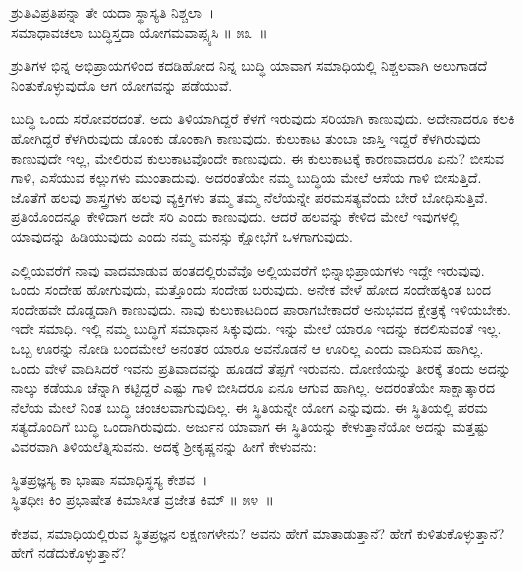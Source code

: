 \begin{shloka}
ಶ್ರುತಿವಿಪ್ರತಿಪನ್ನಾ ತೇ ಯದಾ ಸ್ಥಾಸ್ಯತಿ ನಿಶ್ಚಲಾ~।\\ಸಮಾಧಾವಚಲಾ ಬುದ್ಧಿಸ್ತದಾ ಯೋಗಮವಾಪ್ಸ್ಯಸಿ \hfill॥ ೫೩~॥
\end{shloka}

\begin{artha}
ಶ್ರುತಿಗಳ ಭಿನ್ನ ಅಭಿಪ್ರಾಯಗಳಿಂದ ಕದಡಿಹೋದ ನಿನ್ನ ಬುದ್ಧಿ ಯಾವಾಗ ಸಮಾಧಿಯಲ್ಲಿ ನಿಶ್ಚಲವಾಗಿ ಅಲುಗಾಡದೆ ನಿಂತುಕೊಳ್ಳುವುದೊ ಆಗ ಯೋಗವನ್ನು ಪಡೆಯುವೆ.
\end{artha}

ಬುದ್ಧಿ ಒಂದು ಸರೋವರದಂತೆ. ಅದು ತಿಳಿಯಾಗಿದ್ದರೆ ಕೆಳಗೆ ಇರುವುದು ಸರಿಯಾಗಿ ಕಾಣುವುದು. ಅದೇನಾದರೂ ಕಲಕಿ ಹೋಗಿದ್ದರೆ ಕೆಳಗಿರುವುದು ಡೊಂಕು ಡೊಂಕಾಗಿ ಕಾಣುವುದು. ಕುಲುಕಾಟ ತುಂಬಾ ಜಾಸ್ತಿ ಇದ್ದರೆ ಕೆಳಗಿರುವುದು ಕಾಣುವುದೇ ಇಲ್ಲ, ಮೇಲಿರುವ ಕುಲುಕಾಟವೊಂದೇ ಕಾಣುವುದು. ಈ ಕುಲುಕಾಟಕ್ಕೆ ಕಾರಣವಾದರೂ ಏನು? ಬೀಸುವ ಗಾಳಿ, ಎಸೆಯುವ ಕಲ್ಲುಗಳು ಮುಂತಾದುವು. ಅದರಂತೆಯೇ ನಮ್ಮ ಬುದ್ಧಿಯ ಮೇಲೆ ಆಸೆಯ ಗಾಳಿ ಬೀಸುತ್ತಿದೆ. ಜೊತೆಗೆ ಹಲವು ಶಾಸ್ತ್ರಗಳು ಹಲವು ವ್ಯಕ್ತಿಗಳು ತಮ್ಮ ತಮ್ಮ ನೆಲೆಯನ್ನೇ ಪರಮಸತ್ಯವೆಂದು ಬೇರೆ ಬೋಧಿಸುತ್ತಿವೆ. ಪ್ರತಿಯೊಂದನ್ನೂ ಕೇಳಿದಾಗ ಅದೇ ಸರಿ ಎಂದು ಕಾಣುವುದು. ಆದರೆ ಹಲವನ್ನು ಕೇಳಿದ ಮೇಲೆ ಇವುಗಳಲ್ಲಿ ಯಾವುದನ್ನು ಹಿಡಿಯುವುದು ಎಂದು ನಮ್ಮ ಮನಸ್ಸು ಕ್ಷೋಭೆಗೆ ಒಳಗಾಗುವುದು.

ಎಲ್ಲಿಯವರೆಗೆ ನಾವು ವಾದಮಾಡುವ ಹಂತದಲ್ಲಿರುವೆವೊ ಅಲ್ಲಿಯವರೆಗೆ ಭಿನ್ನಾಭಿಪ್ರಾಯಗಳು ಇದ್ದೇ ಇರುವುವು. ಒಂದು ಸಂದೇಹ ಹೋಗುವುದು, ಮತ್ತೊಂದು ಸಂದೇಹ ಬರುವುದು. ಅನೇಕ ವೇಳೆ ಹೋದ ಸಂದೇಹಕ್ಕಿಂತ ಬಂದ ಸಂದೇಹವೇ ದೊಡ್ಡದಾಗಿ ಕಾಣುವುದು. ನಾವು ಕುಲುಕಾಟದಿಂದ ಪಾರಾಗಬೇಕಾದರೆ ಅನುಭವದ ಕ್ಷೇತ್ರಕ್ಕೆ ಇಳಿಯಬೇಕು. ಇದೇ ಸಮಾಧಿ. ಇಲ್ಲಿ ನಮ್ಮ ಬುದ್ಧಿಗೆ ಸಮಾಧಾನ ಸಿಕ್ಕುವುದು. ಇನ್ನು ಮೇಲೆ ಯಾರೂ ಇದನ್ನು ಕದಲಿಸುವಂತೆ ಇಲ್ಲ. ಒಬ್ಬ ಊರನ್ನು ನೋಡಿ ಬಂದಮೇಲೆ ಅನಂತರ ಯಾರೂ ಅವನೊಡನೆ ಆ ಊರಿಲ್ಲ ಎಂದು ವಾದಿಸುವ ಹಾಗಿಲ್ಲ. ಒಂದು ವೇಳೆ ವಾದಿಸಿದರೆ ಇವನು ಪ್ರತಿವಾದವನ್ನು ಹೂಡದೆ ತೆಪ್ಪಗೆ ಇರುವನು. ದೋಣಿಯನ್ನು ತೀರಕ್ಕೆ ತಂದು ಅದನ್ನು ನಾಲ್ಕು ಕಡೆಯೂ ಚೆನ್ನಾಗಿ ಕಟ್ಟಿದ್ದರೆ ಎಷ್ಟು ಗಾಳಿ ಬೀಸಿದರೂ ಏನೂ ಆಗುವ ಹಾಗಿಲ್ಲ. ಅದರಂತೆಯೇ ಸಾಕ್ಷಾತ್ಕಾರದ ನೆಲೆಯ ಮೇಲೆ ನಿಂತ ಬುದ್ಧಿ ಚಂಚಲವಾಗುವುದಿಲ್ಲ. ಈ ಸ್ಥಿತಿಯನ್ನೇ ಯೋಗ ಎನ್ನುವುದು. ಈ ಸ್ಥಿತಿಯಲ್ಲಿ ಪರಮ ಸತ್ಯದೊಂದಿಗೆ ಬುದ್ಧಿ ಒಂದಾಗಿರುವುದು. ಅರ್ಜುನ ಯಾವಾಗ ಈ ಸ್ಥಿತಿಯನ್ನು ಕೇಳುತ್ತಾನೆಯೋ ಅದನ್ನು ಮತ್ತಷ್ಟು ವಿವರವಾಗಿ ತಿಳಿಯಲೆತ್ನಿಸುವನು. ಅದಕ್ಕೆ ಶ‍್ರೀಕೃಷ್ಣನನ್ನು ಹೀಗೆ ಕೇಳುವನು:

\begin{shloka}
ಸ್ಥಿತಪ್ರಜ್ಞಸ್ಯ ಕಾ ಭಾಷಾ ಸಮಾಧಿಸ್ಥಸ್ಯ ಕೇಶವ~।\\ಸ್ಥಿತಧೀಃ ಕಿಂ ಪ್ರಭಾಷೇತ ಕಿಮಾಸೀತ ವ್ರಜೇತ ಕಿಮ್ \hfill॥ ೫೪~॥
\end{shloka}

\begin{artha}
ಕೇಶವ, ಸಮಾಧಿಯಲ್ಲಿರುವ ಸ್ಥಿತಪ್ರಜ್ಞನ ಲಕ್ಷಣಗಳೇನು? ಅವನು ಹೇಗೆ ಮಾತಾಡುತ್ತಾನೆ? ಹೇಗೆ ಕುಳಿತುಕೊಳ್ಳುತ್ತಾನೆ? ಹೇಗೆ ನಡೆದುಕೊಳ್ಳುತ್ತಾನೆ?
\end{artha}

